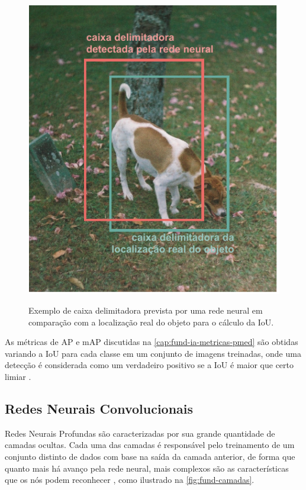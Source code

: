 \begin{figure}[h!] %
  \centering
  \caption{Exemplo de caixa delimitadora prevista por uma rede neural em comparação com a localização real do objeto para o cálculo da IoU.}
  \includegraphics[scale=1.1]{img/img-fundamentacao-iou.pdf}
  \label{fig:fund-iou}
\end{figure}

As métricas de AP e mAP discutidas na \autoref{cap:fund-ia-metricas-pmed} são obtidas variando a IoU para cada classe em um conjunto de imagens treinadas, onde uma detecção é considerada como um verdadeiro positivo se a IoU é maior que certo limiar \cite{ref:Sivarajkumar} .



\subsection{Redes Neurais Convolucionais} \label{cap:fund-ia-rn-conv}
Redes Neurais Profundas são caracterizadas por sua grande quantidade de camadas ocultas. Cada uma das camadas é responsável pelo treinamento de um conjunto distinto de dados com base na saída da camada anterior, de forma que quanto mais há avanço pela rede neural, mais complexos são as características que os nós podem reconhecer \cite{ref:Nicholson}, como ilustrado na \autoref{fig:fund-camadas}.

